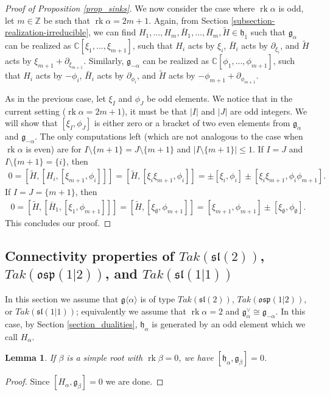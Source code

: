 \documentclass[12pt, a4paper, reqno]{amsart}
\def\p{\mathfrak{p}}
\def\g{\mathfrak{g}}
\def\h{\mathfrak{h}}
\def\l{\mathfrak{l}}
\def\s{\mathfrak{s}}
\def\o{\mathfrak{o}}
\def\ol{\overline}
\def\rk{\operatorname{rk}}
\newtheorem{lemma}{Lemma}
\theoremstyle{definition}
\theoremstyle{definition}
\theoremstyle{definition}
\numberwithin{theorem}{section}
\numberwithin{lemma}{section}
\numberwithin{remark}{section}
\numberwithin{definition}{section}
\numberwithin{corollary}{section}
\numberwithin{proposition}{section}
\numberwithin{example}{section}
\begin{document}
\begin{proof}[Proof of Proposition \ref{prop_sinks}]
		We now consider the case where \(\rk\alpha\) is odd, let \(m \in \mathbb{Z}\) be such that \(\rk\alpha = 2m+1\). Again, from Section \ref{subsection-realization-irreducible}, we can find \(H_1,...,H_m,\bar{H}_1,...,\bar{H}_m,\tilde{H} \in \mathfrak{h}_{\ol{1}}\) such that \(\mathfrak{g}_{\alpha}\) can be realized as \(\mathbb{C}[\xi_1,...,\xi_{m+1}]\), such that \(H_i\) acts by \(\xi_i\), \(\bar{H}_i\) acts by \(\partial_{\xi_i}\), and \(\tilde{H}\) acts by \(\xi_{m+1}+\partial_{\xi_{m+1}}\). Similarly, \(\mathfrak{g}_{-\alpha}\) can be realized as \(\mathbb{C}[\phi_1,...,\phi_{m+1}]\), such that \(H_i\) acts by \(-\phi_i\), \(\bar{H}_i\) acts by \(\partial_{\phi_i}\), and \(\tilde{H}\) acts by \(-\phi_{m+1}+\partial_{\phi_{m+1}}\). \par
		As in the previous case, let \(\xi_I\) and \(\phi_J\) be odd elements. We notice that in the current setting (\(\rk\alpha = 2m+1\)), it must be that \(\lvert I \rvert\) and \(\lvert J \rvert\) are odd integers. We will show that \([\xi_I,\phi_J]\) is either zero or a bracket of two even elements from \(\mathfrak{g}_{\alpha}\) and \(\mathfrak{g}_{-\alpha}\). The only computations left (which are not analogous to the case when \(\rk\alpha\) is even) are for \(I\setminus \{m+1\} = J\setminus \{m+1\}\) and \(\lvert I\setminus \{m+1\} \rvert \leq 1\). If \(I=J\) and \(I\setminus\{m+1\} = \{i\}\), then
		\begin{align*}
			0 = [\tilde{H},[H_i,[\xi_{m+1},\phi_i]]] = [\tilde{H},[\xi_i\xi_{m+1},\phi_i]] = \pm [\xi_i,\phi_i] \pm [\xi_i\xi_{m+1},\phi_i\phi_{m+1}].
		\end{align*}
		If \(I = J = \{m+1\}\), then
		\begin{align*}
			0 = [\tilde{H},[\bar{H}_1,[\xi_1,\phi_{m+1}]]] = [\tilde{H},[\xi_\emptyset,\phi_{m+1}]] = [\xi_{m+1},\phi_{m+1}] \pm [\xi_{\emptyset},\phi_{\emptyset}].
		\end{align*}
		This concludes our proof.
	\end{proof}		
	
	
	\subsection{Connectivity properties of $Tak(\s\l(2))$, $Tak(\o\s\p(1|2))$, and $Tak(\s\l(1|1))$}
	
	In this section we assume that $\g\langle\alpha\rangle$ is of type $Tak(\s\l(2))$, $Tak(\o\s\p(1|2))$, or $Tak(\s\l(1|1))$; equivalently we assume that $\rk\alpha=2$ and $\g_{\alpha}^\vee\cong\g_{-\alpha}$.  In this case, by Section \ref{section_dualities}, $\h_{\alpha}$ is generated by an odd element which we call $H_{\alpha}$.
	\begin{lemma}
		If $\beta$ is a simple root with $\rk\beta=0$, we have $[\h_{\alpha},\g_{\beta}]=0$.  
	\end{lemma}
	\begin{proof}
		Since $[H_{\alpha},\g_{\beta}]=0$ we are done.
	\end{proof}
	
\end{document}
